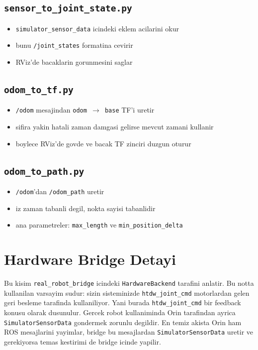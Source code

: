 \documentclass[11pt]{article}
\begin{document}
\subsection*{\texttt{sensor\_to\_joint\_state.py}}
\begin{itemize}
  \item \texttt{simulator\_sensor\_data} icindeki eklem acilarini okur
  \item bunu \texttt{/joint\_states} formatina cevirir
  \item RViz'de bacaklarin gorunmesini saglar
\end{itemize}

\subsection*{\texttt{odom\_to\_tf.py}}
\begin{itemize}
  \item \texttt{/odom} mesajindan \texttt{odom $\rightarrow$ base} TF'i uretir
  \item sifira yakin hatali zaman damgasi gelirse mevcut zamani kullanir
  \item boylece RViz'de govde ve bacak TF zinciri duzgun oturur
\end{itemize}

\subsection*{\texttt{odom\_to\_path.py}}
\begin{itemize}
  \item \texttt{/odom}'dan \texttt{/odom\_path} uretir
  \item iz zaman tabanli degil, nokta sayisi tabanlidir
  \item ana parametreler: \texttt{max\_length} ve \texttt{min\_position\_delta}
\end{itemize}

\section*{Hardware Bridge Detayi}
Bu kisim \texttt{real\_robot\_bridge} icindeki \texttt{HardwareBackend} tarafini anlatir. Bu notta kullanilan varsayim sudur: sizin sisteminizde \texttt{htdw\_joint\_cmd} motorlardan gelen geri besleme tarafinda kullaniliyor. Yani burada \texttt{htdw\_joint\_cmd} bir feedback konusu olarak dusunulur. Gercek robot kullaniminda Orin tarafindan ayrica \texttt{SimulatorSensorData} gondermek zorunlu degildir. En temiz akista Orin ham ROS mesajlarini yayimlar, bridge bu mesajlardan \texttt{SimulatorSensorData} uretir ve gerekiyorsa temas kestirimi de bridge icinde yapilir.
\end{document}
